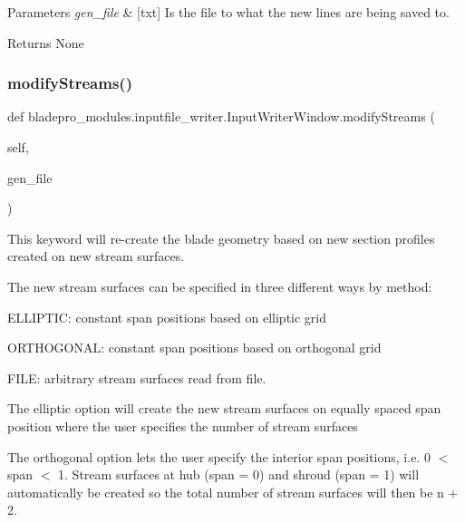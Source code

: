 \begin{DoxyParams}{Parameters}
{\em gen\+\_\+file} & \mbox{[}txt\mbox{]} Is the file to what the new lines are being saved to. \\
\hline
\end{DoxyParams}
\begin{DoxyReturn}{Returns}
None 
\end{DoxyReturn}
\hypertarget{a00071_a66f6209a0c4caa0ba5e25b5fd913eff5}{}\label{a00071_a66f6209a0c4caa0ba5e25b5fd913eff5} 
\subsubsection{\texorpdfstring{modify\+Streams()}{modifyStreams()}}
{\footnotesize\ttfamily def bladepro\+\_\+modules.\+inputfile\+\_\+writer.\+Input\+Writer\+Window.\+modify\+Streams (\begin{DoxyParamCaption}\item[{}]{self,  }\item[{}]{gen\+\_\+file }\end{DoxyParamCaption})}



This keyword will re-\/create the blade geometry based on new section profiles created on new stream surfaces. 

The new stream surfaces can be specified in three different ways by method\+:

\begin{DoxyItemize}
\item {\ttfamily E\+L\+L\+I\+P\+T\+IC\+:} constant span positions based on elliptic grid \item {\ttfamily O\+R\+T\+H\+O\+G\+O\+N\+AL\+:} constant span positions based on orthogonal grid \item {\ttfamily F\+I\+LE\+:} arbitrary stream surfaces read from file.\end{DoxyItemize}
The elliptic option will create the new stream surfaces on equally spaced span position where the user specifies the number of stream surfaces

The orthogonal option lets the user specify the interior span positions, i.\+e. 0 $<$ span $<$ 1. Stream surfaces at hub (span = 0) and shroud (span = 1) will automatically be created so the total number of stream surfaces will then be n + 2.

